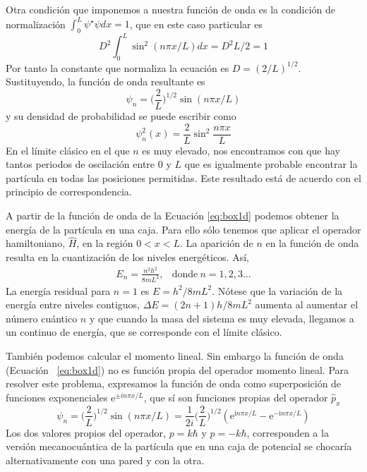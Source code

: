 Otra condición que imponemos a nuestra función de onda es la
condición de normalización 
$\int_0^L\psi^\star \psi dx = 1$, 
que en este caso particular es
\begin{equation}
        D^2\int_0^L\sin^2 (n\pi x/L) dx = D^2L/2= 1
\end{equation}
Por tanto la constante que normaliza la ecuación es
$D=(2/L)^{1/2}$. Sustituyendo, la función de onda
resultante es
\begin{equation}
    \psi_n=\bigg(\frac{2}{L}\bigg)^{1/2}\sin(n\pi x/L)
    \label{eq:box1d}
\end{equation}
y su densidad de probabilidad se puede escribir como
\begin{equation}
    \psi^2_n(x)=\frac{2}{L}\sin^2\frac{n\pi x}{L}
\end{equation}
En el límite clásico en el que $n$ es muy elevado, nos 
encontramos con que hay tantos periodos de oscilación 
entre 0 y $L$ que es igualmente probable encontrar la 
partícula en todas las posiciones permitidas. Este 
resultado está de acuerdo con el principio de 
correspondencia.

A partir de la función de onda de la Ecuación \ref{eq:box1d}
podemos obtener la energía de la partícula en una caja. Para
ello sólo tenemos que aplicar el operador hamiltoniano, 
$\hat{H}$, en la región $0< x<L$. La aparición de $n$ en
la función de onda resulta en la cuantización de los 
niveles energéticos. Así,
\begin{equation}
    \begin{array}{lr}
        E_n =\frac{n^2h^2}{8mL^2},& \mathrm{ donde~}n=1,2,3...
    \end{array}
\end{equation}
La energía residual para $n=1$ es $E=h^2/8mL^2$. 
Nótese que la variación de la energía entre niveles
contiguos, $\Delta E=(2n+1)h/8mL^2$ aumenta al aumentar el
número cuántico $n$ y que cuando la masa del sistema es muy
elevada, llegamos a un continuo de energía, que se
corresponde con el límite clásico.

También podemos calcular el momento lineal. Sin embargo la 
función de onda (Ecuación ~\ref{eq:box1d}) no es función
propia del operador momento lineal. Para resolver este
problema, expresamos la función de onda como superposición
de funciones exponenciales $\mathrm{e}^{\pm in\pi x/L}$, 
que sí son funciones propias del operador $\hat{p}_x$
\begin{equation}
    \psi_n=\bigg(\frac{2}{L}\bigg)^{1/2}\sin(n\pi x/L)=
    \frac{1}{2i}\bigg(\frac{2}{L}\bigg)^{1/2}(\mathrm{e}^{\mathrm{i}n\pi x/L} - \mathrm{e}^{-\mathrm{i}n\pi x/L})
\end{equation}
Los dos valores propios del operador, $p=k\hbar$ y 
$p=-k\hbar$, corresponden a la versión mecanocuántica de 
la partícula que en una caja de potencial se chocaría
alternativamente con una pared y con la otra.

